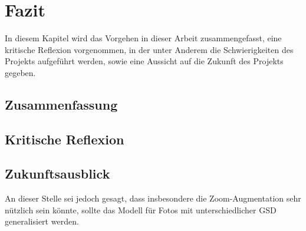 \chapter{Fazit}

In diesem Kapitel wird das Vorgehen in dieser Arbeit zusammengefasst, eine kritische Reflexion vorgenommen, in der unter Anderem die Schwierigkeiten des Projekts aufgeführt werden, sowie eine Aussicht auf die Zukunft des Projekts gegeben. 

\section{Zusammenfassung}


\section{Kritische Reflexion}


\section{Zukunftsausblick}

An dieser Stelle sei jedoch gesagt, dass insbesondere die Zoom-Augmentation sehr nützlich sein könnte, 
sollte das Modell für Fotos mit unterschiedlicher \ac{GSD} generalisiert werden. 